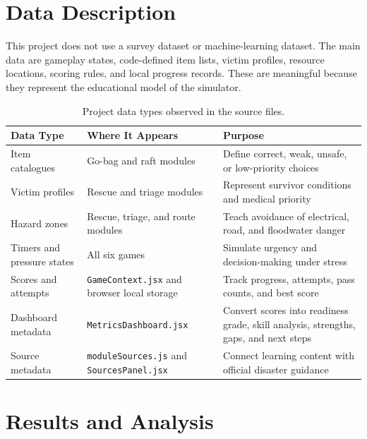 \documentclass[11pt,a4paper]{article}
\newcommand{\code}[1]{\texttt{#1}}
\newcommand{\sectionline}{\vspace{0.2em}{\color{ReportBlue}\hrule height 0.8pt}\vspace{0.6em}}
\begin{document}
\section{Data Description}
\sectionline
This project does not use a survey dataset or machine-learning dataset. The main data are gameplay states, code-defined item lists, victim profiles, resource locations, scoring rules, and local progress records. These are meaningful because they represent the educational model of the simulator.

\begin{table}[h]
\centering
\small
\begin{tabularx}{\textwidth}{L{0.27\textwidth}Y Y}
\toprule
\textbf{Data Type} & \textbf{Where It Appears} & \textbf{Purpose} \\
\midrule
Item catalogues & Go-bag and raft modules & Define correct, weak, unsafe, or low-priority choices \\
Victim profiles & Rescue and triage modules & Represent survivor conditions and medical priority \\
Hazard zones & Rescue, triage, and route modules & Teach avoidance of electrical, road, and floodwater danger \\
Timers and pressure states & All six games & Simulate urgency and decision-making under stress \\
Scores and attempts & \code{GameContext.jsx} and browser local storage & Track progress, attempts, pass counts, and best score \\
Dashboard metadata & \code{MetricsDashboard.jsx} & Convert scores into readiness grade, skill analysis, strengths, gaps, and next steps \\
Source metadata & \code{moduleSources.js} and \code{SourcesPanel.jsx} & Connect learning content with official disaster guidance \\
\bottomrule
\end{tabularx}
\caption{Project data types observed in the source files.}
\end{table}

\section{Results and Analysis}
\sectionline
\end{document}
